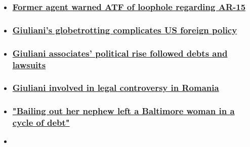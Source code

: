 \begin{itemize}
\item
  \hypertarget{former-agent-warned-atf-of-loophole-regarding-ar-15}{%
  \subsubsection{\texorpdfstring{\href{/videos/politics/2020/02/06/atf-ar-15-gun-law-loophole-glover-pkg-vpx.cnn}{Former
  agent warned ATF of loophole regarding
  AR-15}}{Former agent warned ATF of loophole regarding AR-15}}\label{former-agent-warned-atf-of-loophole-regarding-ar-15}}
\item
  \hypertarget{giulianis-globetrotting-complicates-us-foreign-policy}{%
  \subsubsection{\texorpdfstring{\href{/videos/politics/2019/11/11/rudy-giuliani-investigation-griffin-dnt-newday-vpx.cnn}{Giuliani's
  globetrotting complicates US foreign
  policy}}{Giuliani's globetrotting complicates US foreign policy}}\label{giulianis-globetrotting-complicates-us-foreign-policy}}
\item
  \hypertarget{giuliani-associates-political-rise-followed-debts-and-lawsuits}{%
  \subsubsection{\texorpdfstring{\href{/videos/politics/2019/11/05/rudy-giuliani-associates-trump-griffin-pkg-vpx.cnn}{Giuliani
  associates' political rise followed debts and
  lawsuits}}{Giuliani associates' political rise followed debts and lawsuits}}\label{giuliani-associates-political-rise-followed-debts-and-lawsuits}}
\item
  \hypertarget{giuliani-involved-in-legal-controversy-in-romania-}{%
  \subsubsection{\texorpdfstring{\href{/videos/politics/2019/11/04/romania-giuliani-trump-griffin-pkg-vpx.cnn}{Giuliani
  involved in legal controversy in Romania
  }}{Giuliani involved in legal controversy in Romania }}\label{giuliani-involved-in-legal-controversy-in-romania-}}
\item
  \hypertarget{bailing-out-her-nephew-left-a-baltimore-woman-in-a-cycle-of-debt}{%
  \subsubsection{\texorpdfstring{\href{/videos/us/2019/08/29/bail-bonds-arrests-investigation-drew-griffin-vpx.cnn}{"Bailing
  out her nephew left a Baltimore woman in a cycle of
  debt"}}{"Bailing out her nephew left a Baltimore woman in a cycle of debt"}}\label{bailing-out-her-nephew-left-a-baltimore-woman-in-a-cycle-of-debt}}
\item
  \hypertarget{the-steep-price-of-freedom}{%
}
\end{itemize}
